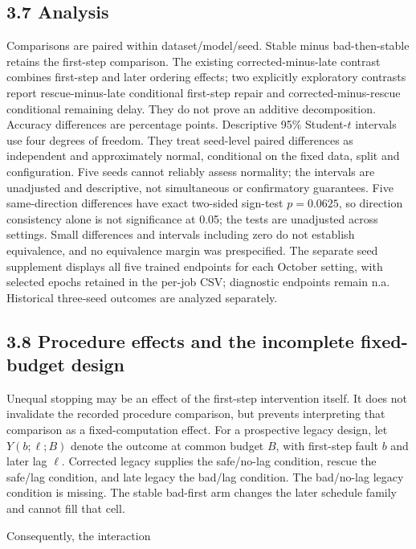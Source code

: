 \documentclass[smallextended]{svjour3}
\begin{document}
\subsection{3.7 Analysis}\label{analysis}

Comparisons are paired within dataset/model/seed. Stable minus bad-then-stable retains the first-step comparison. The existing corrected-minus-late contrast combines first-step and later ordering effects; two explicitly exploratory contrasts report rescue-minus-late conditional first-step repair and corrected-minus-rescue conditional remaining delay. They do not prove an additive decomposition. Accuracy differences are percentage points. Descriptive 95\% Student-\(t\) intervals use four degrees of freedom. They treat seed-level paired differences as independent and approximately normal, conditional on the fixed data, split and configuration. Five seeds cannot reliably assess normality; the intervals are unadjusted and descriptive, not simultaneous or confirmatory guarantees. Five same-direction differences have exact two-sided sign-test \(p=0.0625\), so direction consistency alone is not significance at 0.05; the tests are unadjusted across settings. Small differences and intervals including zero do not establish equivalence, and no equivalence margin was prespecified. The separate seed supplement displays all five trained endpoints for each October setting, with selected epochs retained in the per-job CSV; diagnostic endpoints remain n.a. Historical three-seed outcomes are analyzed separately.

\subsection{3.8 Procedure effects and the incomplete fixed-budget design}\label{procedure-effects-and-the-incomplete-fixed-budget-design}

Unequal stopping may be an effect of the first-step intervention itself. It does not invalidate the recorded procedure comparison, but prevents interpreting that comparison as a fixed-computation effect. For a prospective legacy design, let \(Y(b;\ell;B)\) denote the outcome at common budget \(B\), with first-step fault \(b\) and later lag \(\ell\). Corrected legacy supplies the safe/no-lag condition, rescue the safe/lag condition, and late legacy the bad/lag condition. The bad/no-lag legacy condition is missing. The stable bad-first arm changes the later schedule family and cannot fill that cell.

Consequently, the interaction
\end{document}

